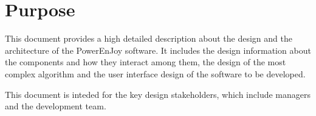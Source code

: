\section{Purpose}
This document provides a high detailed description about the design and the architecture of the PowerEnJoy software.
It includes the design information about the components and how they interact among them, the design of the most complex algorithm and the user interface design of the software to be developed.

This document is inteded for the key design stakeholders, which include managers and the development team.
